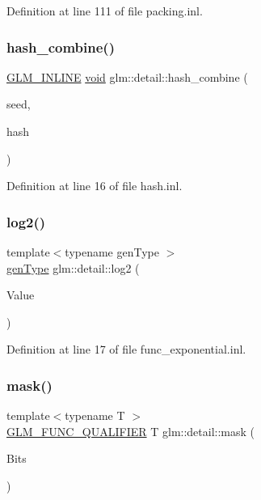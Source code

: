 Definition at line 111 of file packing.\+inl.

\mbox{\label{namespaceglm_1_1detail_a391b3eb8d7f4662a1b31046bd69f2755}} 
\subsubsection{\texorpdfstring{hash\_combine()}{hash\_combine()}}
{\footnotesize\ttfamily \mbox{\hyperlink{setup_8hpp_a4603970cbd724c5d102bbcf17f430047}{G\+L\+M\+\_\+\+I\+N\+L\+I\+NE}} \mbox{\hyperlink{glad_8h_a950fc91edb4504f62f1c577bf4727c29}{void}} glm\+::detail\+::hash\+\_\+combine (\begin{DoxyParamCaption}\item[{size\+\_\+t \&}]{seed,  }\item[{size\+\_\+t}]{hash }\end{DoxyParamCaption})}



Definition at line 16 of file hash.\+inl.

\mbox{\label{namespaceglm_1_1detail_a3d24a612f2c5fa4f3aaf97dcd979ef1c}} 
\subsubsection{\texorpdfstring{log2()}{log2()}}
{\footnotesize\ttfamily template$<$typename gen\+Type $>$ \\
\mbox{\hyperlink{structglm_1_1detail_1_1gen_type}{gen\+Type}} glm\+::detail\+::log2 (\begin{DoxyParamCaption}\item[{\mbox{\hyperlink{structglm_1_1detail_1_1gen_type}{gen\+Type}}}]{Value }\end{DoxyParamCaption})}



Definition at line 17 of file func\+\_\+exponential.\+inl.

\mbox{\label{namespaceglm_1_1detail_a048ad00e8777f9f3ebe185ed48857df0}} 
\subsubsection{\texorpdfstring{mask()}{mask()}}
{\footnotesize\ttfamily template$<$typename T $>$ \\
\mbox{\hyperlink{setup_8hpp_a33fdea6f91c5f834105f7415e2a64407}{G\+L\+M\+\_\+\+F\+U\+N\+C\+\_\+\+Q\+U\+A\+L\+I\+F\+I\+ER}} T glm\+::detail\+::mask (\begin{DoxyParamCaption}\item[{T}]{Bits }\end{DoxyParamCaption})}



